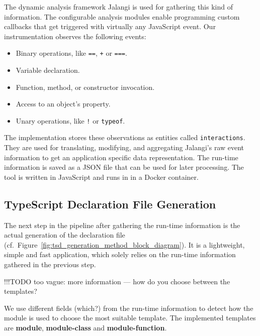 \documentclass[a4paper,english,cleveref, autoref]{lipics-v2019}
\newcommand{\figref}[1]{Figure~\ref{#1}}
\begin{document}
The dynamic analysis framework Jalangi is used for gathering this kind of
information. The configurable analysis modules enable
programming custom callbacks that get triggered with virtually any
JavaScript event. Our instrumentation observes the following events: 
\begin{itemize}
  \item Binary operations, like \lstinline{==}, \lstinline{+} or
    \lstinline{===}.  
  \item Variable declaration.
  \item Function, method, or constructor invocation.
  \item Access to an object's property.
  \item Unary operations, like \lstinline{!} or \lstinline{typeof}.
\end{itemize}

The implementation stores these observations as entities called
\texttt{interactions}. They are used for translating, modifying, and
aggregating Jalangi's raw event information to get an application
specific data representation. The run-time information is saved as a
JSON file that can be used for later processing. The tool is written
in JavaScript and runs in \NodeJS{} in a Docker container. 

\subsection{TypeScript Declaration File Generation}
\label{sec:typescr-decl-file}

The next step in the pipeline after gathering the run-time information is
the actual generation of the declaration file (cf.\
\figref{fig:tsd_generation_method_block_diagram}). It is a lightweight,
simple and fast application, which solely relies on the run-time
information gathered in the previous step.


!!!TODO too vague: more information --- how do you choose between the templates?

We use different fields (which?) from the run-time information to detect
how the module is used to choose the most suitable template. The implemented
templates are \textbf{module}, \textbf{module-class} and
\textbf{module-function}.  
\end{document}
